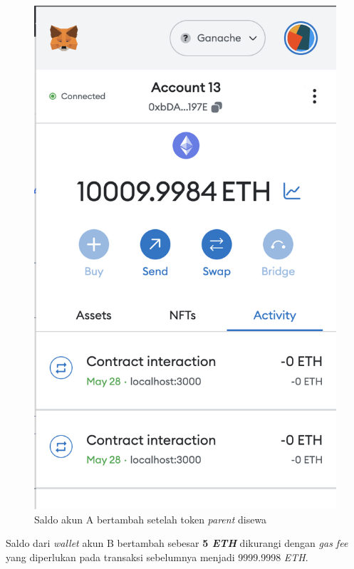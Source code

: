 \begin{itemize}
        \begin{figure} [H] \centering
          \includegraphics[scale=0.4]{gambar/img-test-share-rent-6.png}
          \caption{Saldo akun A bertambah setelah token \emph{parent} disewa}
          \label{fig:TestShareResultRental4}
        \end{figure}
        Saldo dari \emph{wallet} akun B bertambah sebesar \textbf{5 \emph{ETH}} dikurangi dengan \emph{gas fee} yang diperlukan pada transaksi sebelumnya menjadi 9999.9998 \emph{ETH}. 
        \begin{figure} [H] \centering

\end{figure}
\end{itemize}

